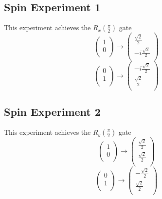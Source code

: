 \documentclass[letterpaper, 12pt]{article}
\begin{document}
  \subsection{Spin Experiment 1}
  This experiment achieves the $R_{x}(\frac{\pi}{2})$ gate
  \[
    \begin{pmatrix}
      1\\
      0\\
    \end{pmatrix}
    \rightarrow
    \begin{pmatrix}
      \frac{\sqrt{2}}{2}\\
      -i\frac{\sqrt{2}}{2}\\
    \end{pmatrix}
   \]
   \[
    \begin{pmatrix}
      0\\
      1\\
    \end{pmatrix}
    \rightarrow
    \begin{pmatrix}
      -i\frac{\sqrt{2}}{2}\\
      \frac{\sqrt{2}}{2}\\
    \end{pmatrix}
  \]

  \subsection{Spin Experiment 2}
  This experiment achieves the $R_{y}(\frac{\pi}{2})$ gate
  \[
    \begin{pmatrix}
      1\\
      0\\
    \end{pmatrix}
    \rightarrow
    \begin{pmatrix}
      \frac{\sqrt{2}}{2}\\
      \frac{\sqrt{2}}{2}\\
    \end{pmatrix}
   \]
   \[
    \begin{pmatrix}
      0\\
      1\\
    \end{pmatrix}
    \rightarrow
    \begin{pmatrix}
      -\frac{\sqrt{2}}{2}\\
      \frac{\sqrt{2}}{2}\\
    \end{pmatrix}
  \]
\end{document}
